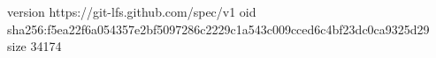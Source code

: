 version https://git-lfs.github.com/spec/v1
oid sha256:f5ea22f6a054357e2bf5097286c2229c1a543c009cced6c4bf23dc0ca9325d29
size 34174
